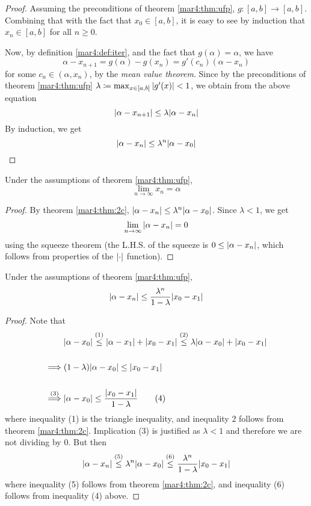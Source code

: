 \begin{proof}
  Assuming the preconditions of theorem \ref{mar4:thm:ufp}, $g \colon [a, b] \to [a, b]$. Combining that with the fact that $x_0 \in [a, b]$, it is easy to see by induction that $x_n \in [a, b]$ for all $n \geq 0$.

  Now, by definition \ref{mar4:def:iter}, and the fact that $g(\alpha) = \alpha$, we have
  \[
    \alpha - x_{n+1} = g(\alpha) - g(x_n) = g'(c_n)(\alpha - x_n)
  \]
  for some $c_n \in (\alpha, x_n)$, by the \emph{mean value theorem}. Since by the preconditions of theorem \ref{mar4:thm:ufp} $\lambda \coloneqq \max_{x \in [a, b]} \abs{g'(x)} < 1$, we obtain from the above equation
  \[
    \abs{\alpha - x_{n+1}} \leq \lambda\abs{\alpha - x_n}
  \]
  By induction, we get
  \[
    \abs{\alpha - x_n} \leq \lambda^n\abs{\alpha - x_0}
  \]
  \hfill
\end{proof}
\begin{corr}
  Under the assumptions of theorem \ref{mar4:thm:ufp},
  \[
    \lim_{n\to\infty} x_n = \alpha
  \]
\end{corr}
\begin{proof}
  By theorem \ref{mar4:thm:2c}, $\abs{\alpha - x_n} \leq \lambda^n\abs{\alpha - x_0}$. Since $\lambda < 1$, we get
  \[
    \lim_{n\to\infty}\abs{\alpha - x_n} = 0
  \]
  using the squeeze theorem (the L.H.S. of the squeeze is $0 \leq \abs{\alpha - x_n}$, which follows from properties of the $\abs{\cdot}$ function).
  \hfill
\end{proof}
\begin{corr}
  Under the assumptions of theorem \ref{mar4:thm:ufp},
  \[
    \abs{\alpha - x_n} \leq \frac{\lambda^n}{1 - \lambda}\abs{x_0 - x_1}
  \]
\end{corr}
\begin{proof}
  Note that
  \begin{align*}
    &\abs{\alpha - x_0}
      \lao[\leq]{1} \abs{\alpha - x_1} + \abs{x_0 - x_1}
      \lao[\leq]{2} \lambda\abs{\alpha - x_0} + \abs{x_0 - x_1} \\\\
    \implies&
              (1-\lambda)\abs{\alpha - x_0}
              \leq
              \abs{x_0 - x_1} \\\\
    \lao[\implies]{3}&
              \abs{\alpha - x_0}
              \leq
              \frac{\abs{x_0 - x_1}}{1-\lambda} \tag{4}
  \end{align*}
  where inequality (1) is the triangle inequality, and inequality 2 follows from theorem \ref{mar4:thm:2c}. Implication (3) is justified as $\lambda < 1$ and therefore we are not dividing by 0. But then
  \[
    \abs{\alpha - x_n}
    \lao[\leq]{5}
    \lambda^n\abs{\alpha - x_0}
    \lao[\leq]{6}
    \frac{\lambda^n}{1-\lambda}\abs{x_0 - x_1}
  \]
  where inequality (5) follows from theorem \ref{mar4:thm:2c}, and inequality (6) follows from inequality (4) above.
  
  \hfill
\end{proof}
